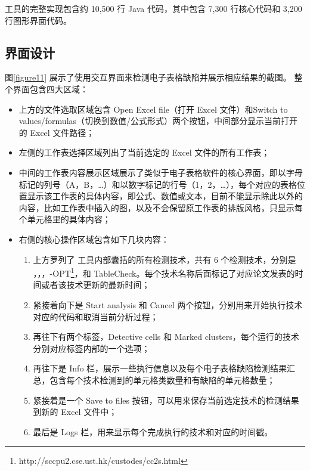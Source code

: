 \sg 工具的完整实现包含约 10,500 行 Java 代码，其中包含 7,300 行核心代码和 3,200 行图形界面代码。

\subsection{界面设计}

% 



% 
图\ref{figure11} 展示了\sg 使用交互界面来检测电子表格缺陷并展示相应结果的截图。
整个界面包含四大区域：

\begin{itemize}
    \item 上方的文件选取区域包含 Open Excel file（打开 Excel 文件）和Switch to values/formulas（切换到数值/公式形式）两个按钮，中间部分显示当前打开的 Excel 文件路径；
    
    \item 左侧的工作表选择区域列出了当前选定的 Excel 文件的所有工作表；
    
    \item 中间的工作表内容展示区域展示了类似于电子表格软件的核心界面，即以字母标记的列号（A，B，\dots）和以数字标记的行号（1，2，\dots），每个对应的表格位置显示该工作表的具体内容，即公式、数值或文本，目前不能显示除此以外的内容，比如工作表中插入的图，以及不会保留原工作表的排版风格，只显示每个单元格里的具体内容；
    
    \item 右侧的核心操作区域包含如下几块内容：

        \begin{enumerate}
            \item 上方罗列了 \sg 工具内部囊括的所有检测技术，共有 6 个检测技术，分别是 \am\cite{dou2014spreadsheet}，\ca\cite{dou2017cacheck}，\cu\cite{cheung2016custodes}，\cu-OPT\footnote{http://sccpu2.cse.ust.hk/custodes/cc2s.html}，\wa 和 TableCheck\cite{dou2016detecting}。每个技术名称后面标记了对应论文发表的时间或者该技术更新的最新时间；
            
            \item 紧接着向下是 Start analysis 和 Cancel 两个按钮，分别用来开始执行技术对应的代码和取消当前分析过程；
            
            \item 再往下有两个标签，Detective cells 和 Marked clusters，每个运行的技术分别对应标签内部的一个选项；
            
            \item 再往下是 Info 栏，展示一些执行信息以及每个电子表格缺陷检测结果汇总，包含每个技术检测到的单元格类数量和有缺陷的单元格数量；
            
            \item 紧接着是一个 Save to files 按钮，可以用来保存当前选定技术的检测结果到新的 Excel 文件中；
            
            \item 最后是 Logs 栏，用来显示每个完成执行的技术和对应的时间戳。
        \end{enumerate}

\end{itemize}

